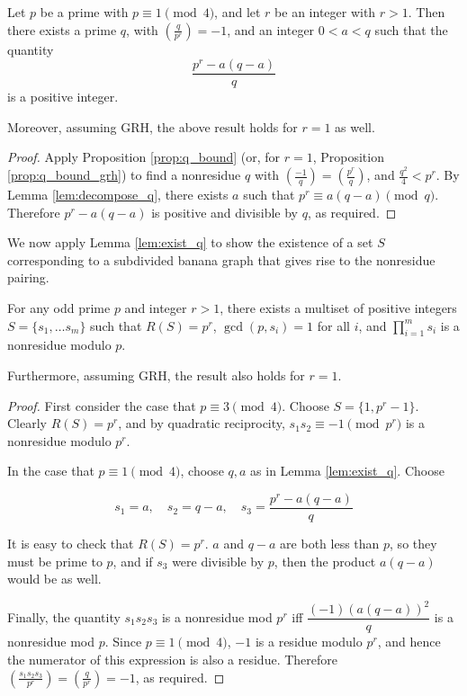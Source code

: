 \documentclass{amsart}
\begin{document}
\begin{lem}
  \label{lem:exist_q}
  Let $p$ be a prime with $p \equiv 1 \pmod 4$, and let $r$ be an
  integer with $r > 1$. Then there exists a prime $q$, with $\left(
    \frac{q}{p^r} \right) = -1$, and an integer $0 < a < q$ such that
  the quantity
  \[\frac{p^r - a(q-a)}{q}\]
  is a positive integer.

  Moreover, assuming GRH, the above result holds for $r=1$ as well.
\end{lem}
\begin{proof}
  Apply Proposition \ref{prop:q_bound} (or, for $r=1$, Proposition
  \ref{prop:q_bound_grh}) to find a nonresidue $q$ with
  $\left(\frac{-1}{q}\right) = \left(\frac{p^r}{q}\right)$, and
  $\frac{q^2}{4} < p^r$. By Lemma \ref{lem:decompose_q}, there exists
  $a$ such that $p^r \equiv a(q-a) \pmod q$. Therefore $p^r - a(q-a)$
  is positive and divisible by $q$, as required.
\end{proof}

We now apply Lemma \ref{lem:exist_q} to show the existence of a set
$S$ corresponding to a subdivided banana graph that gives rise to the
nonresidue pairing.

\begin{prop}
  \label{prop:exist_decomp}
  For any odd prime $p$ and integer $r > 1$, there exists a
  multiset of positive integers $S = \{s_1, \ldots s_m\}$ such that
  $R(S) = p^r$, $\gcd(p, s_i) = 1$ for all $i$, and $\prod_{i=1}^ms_i$
  is a nonresidue modulo $p$.
  
  Furthermore, assuming GRH, the result also holds for $r=1$.
\end{prop}

\begin{proof}
  First consider the case that $p \equiv 3 \pmod 4$. Choose $S = \{1,
  p^r-1\}$. Clearly $R(S) = p^r$, and by quadratic reciprocity,
  $s_1s_2 \equiv -1 \pmod {p^r}$ is a nonresidue modulo $p^r$.

  In the case that $p \equiv 1 \pmod 4$, choose $q,a$ as in
  Lemma \ref{lem:exist_q}. Choose

  \[s_1 = a, \quad s_2 =  q-a, \quad s_3 = \frac{p^r - a(q-a)}{q}\]

  It is easy to check that $R(S) = p^r$. $a$ and $q-a$ are both less
  than $p$, so they must be prime to $p$, and if $s_3$ were divisible
  by $p$, then the product $a(q-a)$ would be as well.

  Finally, the quantity $s_1s_2s_3$ is a nonresidue mod $p^r$ iff
  $\dfrac{(-1)(a(q-a))^2}{q}$ is a nonresidue mod $p$. Since $p \equiv
  1 \pmod 4$, $-1$ is a residue modulo $p^r$, and hence the numerator
  of this expression is also a residue. Therefore $\left(
    \frac{s_1s_2s_3}{p^r} \right) = \left( \frac{q}{p^r} \right) =
  -1$, as required.
\end{proof}
\end{document}
